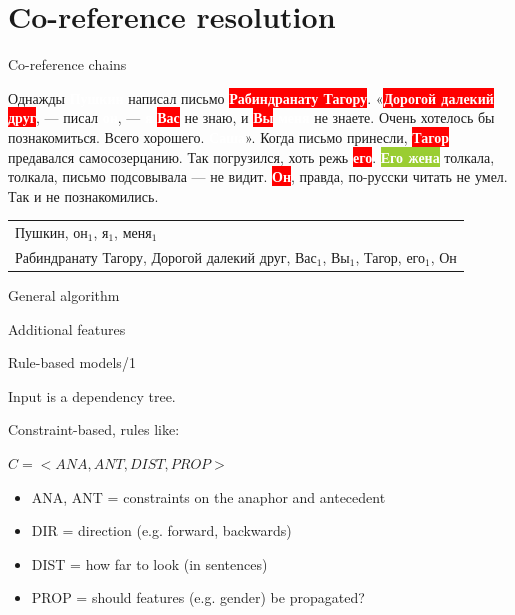 \documentclass[dvipsnames, 10pt, compress]{beamer}
\newcommand{\redfillbox}[1]{\colorbox{red}{\textcolor{white}{{\bf #1}}}}
\newcommand{\bluefillbox}[1]{\colorbox{ProcessBlue}{\textcolor{white}{{\bf #1}}}}
\newcommand{\greenfillbox}[1]{\colorbox{YellowGreen}{\textcolor{white}{{\bf #1}}}}
\begin{document}
\section{Co-reference resolution}


\begin{frame}


\end{frame}


\begin{frame}{Co-reference chains}

Однажды \bluefillbox{Пушкин} написал письмо \redfillbox{Рабиндранату Тагору}. 
«\redfillbox{Дорогой далекий друг}, — писал \bluefillbox{он}, — \bluefillbox{я} \redfillbox{Вас} не знаю, и \redfillbox{Вы} \bluefillbox{меня} не знаете.
Очень хотелось бы познакомиться. Всего хорошего. \bluefillbox{Саша}».
Когда письмо принесли, \redfillbox{Тагор} предавался самосозерцанию. 
Так погрузился, хоть режь \redfillbox{его}. 
\greenfillbox{Его жена} толкала, толкала, письмо подсовывала — не видит. 
\redfillbox{Он}, правда, по-русски читать не умел. Так и не познакомились.

\begin{tabular}{l}
{ Пушкин, он$_1$, я$_1$, меня$_1$ } \\ 
{ Рабиндранату Тагору, Дорогой далекий друг, Вас$_1$, Вы$_1$, Тагор, его$_1$, Он} \\
\end{tabular}

\end{frame}

\begin{frame}{General algorithm}

\end{frame}


\begin{frame}{Additional features}

\end{frame}


\begin{frame}{Rule-based models/1} %

Input is a dependency tree.

Constraint-based, rules like:

$C = <ANA,  ANT, DIST, PROP>$

\begin{itemize}
  \item ANA, ANT = constraints on the anaphor and antecedent
  \item DIR = direction (e.g. forward, backwards)
  \item DIST = how far to look (in sentences)
  \item PROP = should features (e.g. gender) be propagated?
\end{itemize}

\end{frame}
\end{document}
